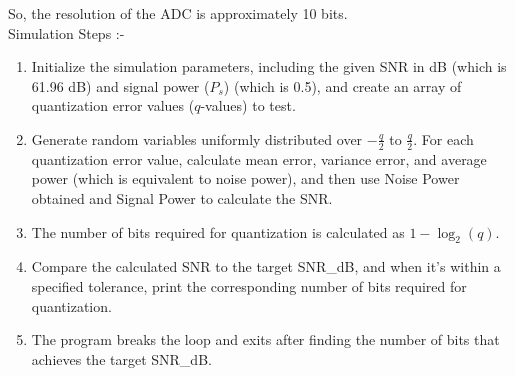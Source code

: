 \documentclass[journal,12pt,onecolumn]{IEEEtran}
\begin{document}
So, the resolution of the ADC is approximately 10 bits.\\

Simulation Steps :- \\
\begin{enumerate}
\item Initialize the simulation parameters, including the given SNR in dB (which is 61.96 dB) and signal power ($P_s$) (which is 0.5), and create an array of quantization error values ($q$-values) to test.\\
\item Generate random variables uniformly distributed over $-\frac{q}{2}$ to $\frac{q}{2}$. For each quantization error value, calculate mean error, variance error, and average power (which is equivalent to noise power), and then use Noise Power obtained and Signal Power to calculate the SNR. \\
\item The number of bits required for quantization is calculated as $1 - \log_2(q)$.\\
\item Compare the calculated SNR to the target SNR\_dB, and when it's within a specified tolerance, print the corresponding number of bits required for quantization.\\
\item The program breaks the loop and exits after finding the number of bits that achieves the target SNR\_dB.
\end{enumerate}
\end{document}
